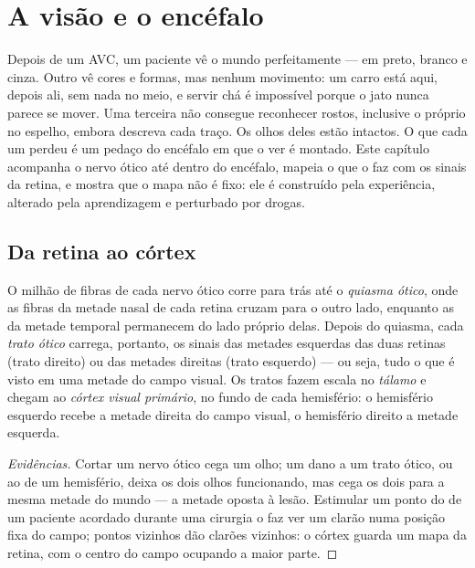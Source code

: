 \chapter{A visão e o encéfalo}\label{ch:g11:vision-and-brain}

Depois de um AVC, um paciente vê o mundo perfeitamente --- em preto,
branco e cinza. Outro vê cores e formas, mas nenhum movimento: um carro
está aqui, depois ali, sem nada no meio, e servir chá é impossível
porque o jato nunca parece se mover. Uma terceira não consegue
reconhecer rostos, inclusive o próprio no espelho, embora descreva cada
traço. Os olhos deles estão intactos. O que cada um perdeu é um pedaço
do encéfalo em que o ver é montado. Este capítulo acompanha o nervo
ótico até dentro do encéfalo, mapeia o que o  faz com os
sinais da retina, e mostra que o mapa não é fixo: ele é construído pela
experiência, alterado pela aprendizagem e perturbado por drogas.

\section{Da retina ao córtex}

\begin{proposition}\label{prop:g11:vision-and-brain:pathway}
O milhão de fibras de cada nervo ótico corre para trás até o
\emph{quiasma ótico}, onde as fibras da metade nasal de cada retina
cruzam para o outro lado, enquanto as da metade temporal permanecem do
lado próprio delas. Depois do quiasma, cada \emph{trato ótico} carrega,
portanto, os sinais das metades esquerdas das duas retinas (trato
direito) ou das metades direitas (trato esquerdo) --- ou seja, tudo o
que é visto em uma metade do campo visual. Os tratos fazem escala no
\emph{tálamo} e chegam ao
\emph{córtex visual primário}, no fundo de cada
hemisfério: o hemisfério esquerdo recebe a metade direita do campo
visual, o hemisfério direito a metade esquerda.
\end{proposition}
\begin{proof}[Evidências]
Cortar um nervo ótico cega um olho; um dano a um trato ótico, ou ao
 de um hemisfério, deixa os dois olhos funcionando, mas
cega os dois para a mesma metade do mundo --- a metade oposta à lesão.
Estimular um ponto do  de um paciente acordado durante uma
cirurgia o faz ver um clarão numa posição fixa do campo; pontos
vizinhos dão clarões vizinhos: o córtex guarda um mapa da retina, com o
centro do campo ocupando a maior parte.
\end{proof}

